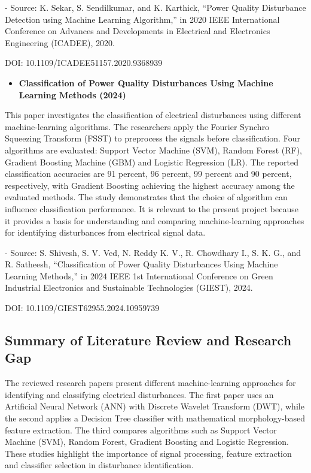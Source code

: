 \documentclass[12pt]{article}
\begin{document}
\begin{center}
 - Source: K. Sekar, S. Sendilkumar, and K. Karthick, “Power Quality Disturbance Detection using Machine Learning Algorithm,” in 2020 IEEE International Conference on Advances and Developments in Electrical and Electronics Engineering (ICADEE), 2020.

DOI: 10.1109/ICADEE51157.2020.9368939

 \begin{itemize}
     \item \textbf{Classification of Power Quality Disturbances Using Machine Learning Methods (2024)}
 \end{itemize}
 This paper investigates the classification of electrical disturbances using different machine-learning algorithms. The researchers apply the Fourier Synchro Squeezing Transform (FSST) to preprocess the signals before classification. Four algorithms are evaluated: Support Vector Machine (SVM), Random Forest (RF), Gradient Boosting Machine (GBM) and Logistic Regression (LR). The reported classification accuracies are 91 percent, 96 percent, 99 percent and 90 percent, respectively, with Gradient Boosting achieving the highest accuracy among the evaluated methods. The study demonstrates that the choice of algorithm can influence classification performance. It is relevant to the present project because it provides a basis for understanding and comparing machine-learning approaches for identifying disturbances from electrical signal data.

 - Source: S. Shivesh, S. V. Ved, N. Reddy K. V., R. Chowdhary I., S. K. G., and R. Satheesh, “Classification of Power Quality Disturbances Using Machine Learning Methods,” in 2024 IEEE 1st International Conference on Green Industrial Electronics and Sustainable Technologies (GIEST), 2024.

DOI: 10.1109/GIEST62955.2024.10959739
 \vspace{1cm}
 

\subsection{Summary of Literature Review and Research Gap}
\raggedright
\justifying
The reviewed research papers present different machine-learning approaches for identifying and classifying electrical disturbances. The first paper uses an Artificial Neural Network (ANN) with Discrete Wavelet Transform (DWT), while the second applies a Decision Tree classifier with mathematical morphology-based feature extraction. The third compares algorithms such as Support Vector Machine (SVM), Random Forest, Gradient Boosting and Logistic Regression. These studies highlight the importance of signal processing, feature extraction and classifier selection in disturbance identification.\\


\end{center}
\end{document}
